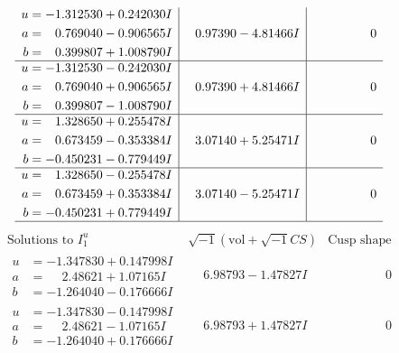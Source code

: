 \documentclass[1p]{elsarticle_modified}
\theoremstyle{definition}
\newcommand{\I}{\sqrt{-1}}
\begin{document}
$$\begin{array}{c|c|c}
\begin{aligned}
u &= -1.312530 + 0.242030 I \\
a &= \phantom{-}0.769040 - 0.906565 I \\
b &= \phantom{-}0.399807 + 1.008790 I\end{aligned}
 & \phantom{-}0.97390 - 4.81466 I & \phantom{-0.000000 } 0 \\ \hline\begin{aligned}
u &= -1.312530 - 0.242030 I \\
a &= \phantom{-}0.769040 + 0.906565 I \\
b &= \phantom{-}0.399807 - 1.008790 I\end{aligned}
 & \phantom{-}0.97390 + 4.81466 I & \phantom{-0.000000 } 0 \\ \hline\begin{aligned}
u &= \phantom{-}1.328650 + 0.255478 I \\
a &= \phantom{-}0.673459 - 0.353384 I \\
b &= -0.450231 - 0.779449 I\end{aligned}
 & \phantom{-}3.07140 + 5.25471 I & \phantom{-0.000000 } 0 \\ \hline\begin{aligned}
u &= \phantom{-}1.328650 - 0.255478 I \\
a &= \phantom{-}0.673459 + 0.353384 I \\
b &= -0.450231 + 0.779449 I\end{aligned}
 & \phantom{-}3.07140 - 5.25471 I & \phantom{-0.000000 } 0\\
 \hline 
 \end{array}$$\newpage$$\begin{array}{c|c|c}  
\text{Solutions to }I^u_{1}& \I (\text{vol} + \sqrt{-1}CS) & \text{Cusp shape}\\
 \hline 
\begin{aligned}
u &= -1.347830 + 0.147998 I \\
a &= \phantom{-}2.48621 + 1.07165 I \\
b &= -1.264040 - 0.176666 I\end{aligned}
 & \phantom{-}6.98793 - 1.47827 I & \phantom{-0.000000 } 0 \\ \hline\begin{aligned}
u &= -1.347830 - 0.147998 I \\
a &= \phantom{-}2.48621 - 1.07165 I \\
b &= -1.264040 + 0.176666 I\end{aligned}
 & \phantom{-}6.98793 + 1.47827 I & \phantom{-0.000000 } 0 \\ \hline\begin{aligned}

\end{aligned}
\end{array}$$
\end{document}
